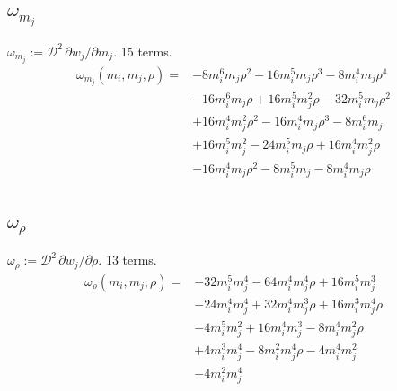 \subsection*{$\omega_{m_j}$}
$\omega_{m_j}:=\mathcal D^2\,\partial w_j/\partial m_j$. 15 terms.
{\small
\begin{align*}
\omega_{m_j}(m_i,m_j,\rho)={}&-8m_i^{6}m_j\rho^{2}-16m_i^{5}m_j\rho^{3}-8m_i^{4}m_j\rho^{4}\\
&-16m_i^{6}m_j\rho+16m_i^{5}m_j^{2}\rho-32m_i^{5}m_j\rho^{2}\\
&+16m_i^{4}m_j^{2}\rho^{2}-16m_i^{4}m_j\rho^{3}-8m_i^{6}m_j\\
&+16m_i^{5}m_j^{2}-24m_i^{5}m_j\rho+16m_i^{4}m_j^{2}\rho\\
&-16m_i^{4}m_j\rho^{2}-8m_i^{5}m_j-8m_i^{4}m_j\rho
\end{align*}
}

\subsection*{$\omega_\rho$}
$\omega_\rho:=\mathcal D^2\,\partial w_j/\partial\rho$. 13 terms.
{\small
\begin{align*}
\omega_\rho(m_i,m_j,\rho)={}&-32m_i^{5}m_j^{4}-64m_i^{4}m_j^{4}\rho+16m_i^{5}m_j^{3}\\
&-24m_i^{4}m_j^{4}+32m_i^{4}m_j^{3}\rho+16m_i^{3}m_j^{4}\rho\\
&-4m_i^{5}m_j^{2}+16m_i^{4}m_j^{3}-8m_i^{4}m_j^{2}\rho\\
&+4m_i^{3}m_j^{4}-8m_i^{2}m_j^{4}\rho-4m_i^{4}m_j^{2}\\
&-4m_i^{2}m_j^{4}
\end{align*}
}

